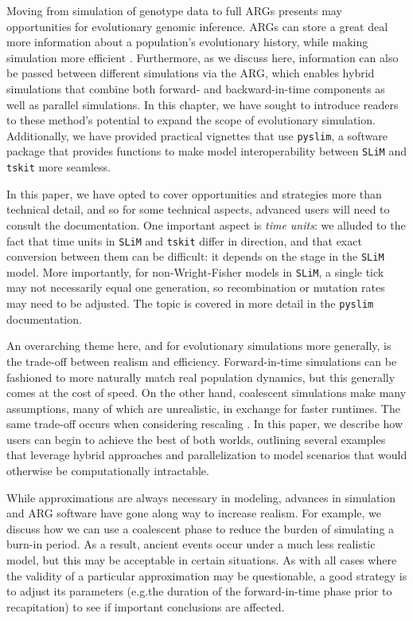 \documentclass[12pt]{article}
\newcommand{\tskit}[0]{\texttt{tskit}\xspace}
\newcommand{\slim}[0]{\texttt{SLiM}\xspace}
\newcommand{\pyslim}[0]{\texttt{pyslim}\xspace}
\newcommand*{\eg}{e.g.\xcomma}
\begin{document}
Moving from simulation of genotype data to full ARGs presents may opportunities for evolutionary genomic inference.
ARGs can store a great deal more information about a population's evolutionary history,
while making simulation more efficient \citep{kelleher_efficient_2018}.
Furthermore, as we discuss here, information can also be passed between different simulations via the ARG,
which enables hybrid simulations that combine both forward- and backward-in-time components as well as parallel simulations.
In this chapter, we have sought to introduce readers to these method's potential to expand the scope of evolutionary simulation.
Additionally, we have provided practical vignettes that use \pyslim,
a software package that provides functions to make model interoperability between \slim and \tskit more seamless.

In this paper, we have opted to cover opportunities and strategies more than technical detail,
and so for some technical aspects, advanced users will need to consult the documentation.
One important aspect is \emph{time units}:
we alluded to the fact that time units in \slim and \tskit differ in direction,
and that exact conversion between them can be difficult:
it depends on the stage in the \slim model.
More importantly, for non-Wright-Fisher models in \slim, a single tick may not necessarily equal one generation,
so recombination or mutation rates may need to be adjusted.
The topic is covered in more detail in the \pyslim documentation.

An overarching theme here, and for evolutionary simulations more generally, is the trade-off between realism and efficiency.
Forward-in-time simulations can be fashioned to more naturally match real population dynamics,
but this generally comes at the cost of speed. On the other hand, coalescent simulations make many assumptions, many of which
are unrealistic, in exchange for faster runtimes.
The same trade-off occurs when considering rescaling \citep{cury_simulation_2022,dabi_population_2025}.
In this paper, we describe how users can begin to achieve the best of both worlds,
outlining several examples that leverage hybrid approaches and parallelization to model scenarios that would otherwise be
computationally intractable.

While approximations are always necessary in modeling, advances in simulation and ARG software have gone along way to increase realism.
For example, we discuss how we
can use a coalescent phase to reduce the burden of simulating a burn-in period.
As a result, ancient events occur under a much less realistic model, but this may be acceptable in certain situations.
As with all cases where the validity of a particular approximation may be questionable, a good strategy is to adjust its parameters
(\eg the duration of the forward-in-time phase prior to recapitation) to see if important conclusions are affected.










\newpage
\appendix
\end{document}

